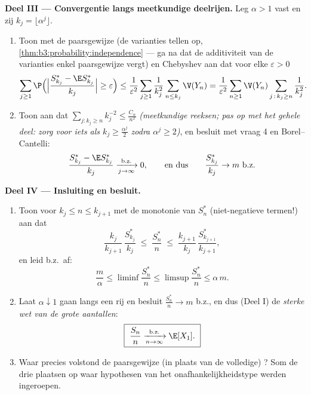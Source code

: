 \begin{problem}
\medskip
\noindent\textbf{Deel III --- Convergentie langs meetkundige
deelrijen.} Leg $\alpha > 1$ vast en zij $k_j =
\lfloor\alpha^j\rfloor$.
\begin{enumerate}[resume]
  \item Toon met de paarsgewijze  (de varianties
        tellen op, \cref{thm:b3:probability:independence} --- ga
        na dat de additiviteit van de varianties enkel
        paarsgewijze  vergt) en Chebyshev aan
        dat voor elke $\varepsilon > 0$
        \[
        \sum_{j\geq1}\P\Bigl(\Bigl|
        \frac{S^*_{k_j} - \E S^*_{k_j}}{k_j}\Bigr| \geq
        \varepsilon\Bigr)
        \leq
        \frac1{\varepsilon^2}\sum_{j\geq1}\frac1{k_j^2}
        \sum_{n\leq k_j}\V(Y_n)
        = \frac1{\varepsilon^2}\sum_{n\geq1}\V(Y_n)
        \sum_{j\,:\,k_j\geq n}\frac1{k_j^2} .
        \]
  \item Toon aan dat $\sum_{j : k_j \geq n}k_j^{-2} \leq
        \frac{C_\alpha}{n^2}$ \emph{(meetkundige reeksen; pas op
        met het gehele deel: zorg voor iets als $k_j \geq
        \frac{\alpha^j}2$ zodra $\alpha^j \geq 2$)}, en besluit
        met vraag 4 en Borel--Cantelli:
        \[
        \frac{S^*_{k_j} - \E S^*_{k_j}}{k_j}
        \xrightarrow[j\to\infty]{\text{b.z.}} 0,
        \qquad\text{en dus}\qquad
        \frac{S^*_{k_j}}{k_j} \to m \ \text{b.z.}
        \]
\end{enumerate}

\medskip
\noindent\textbf{Deel IV --- Insluiting en besluit.}
\begin{enumerate}[resume]
  \item Toon voor $k_j \leq n \leq k_{j+1}$ met de monotonie van
        $S^*_n$ (niet-negatieve termen!) aan dat
        \[
        \frac{k_j}{k_{j+1}}\,\frac{S^*_{k_j}}{k_j}
        \;\leq\; \frac{S^*_n}{n} \;\leq\;
        \frac{k_{j+1}}{k_j}\,\frac{S^*_{k_{j+1}}}{k_{j+1}},
        \]
        en leid b.z.\ af:
        \[
        \frac m\alpha \leq \liminf\frac{S^*_n}n \leq
        \limsup\frac{S^*_n}n \leq \alpha\,m .
        \]
  \item Laat $\alpha \downarrow 1$ gaan langs een rij en besluit
        $\frac{S_n^*}n \to m$ b.z., en dus (Deel I) de
        \emph{sterke wet van de grote aantallen}:
        \[
        \boxed{\ \frac{S_n}{n}
        \xrightarrow[n\to\infty]{\text{b.z.}} \E[X_1].\ }
        \]
  \item Waar precies volstond de paarsgewijze (in plaats van de
        volledige) ? Som de drie plaatsen op
        waar hypothesen van het onafhankelijkheidstype werden
        ingeroepen.
\end{enumerate}


\end{problem}
